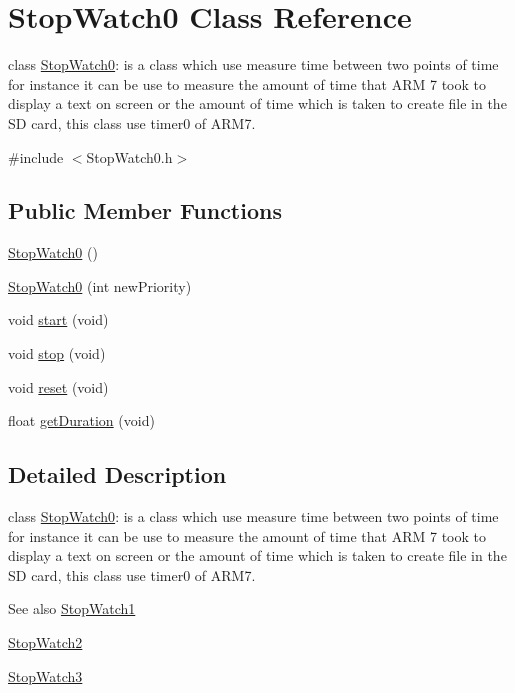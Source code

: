 \hypertarget{class_stop_watch0}{
\section{StopWatch0 Class Reference}
\label{class_stop_watch0}
}


class \hyperlink{class_stop_watch0}{StopWatch0}: is a class which use measure time between two points of time for instance it can be use to measure the amount of time that ARM 7 took to display a text on screen or the amount of time which is taken to create file in the SD card, this class use timer0 of ARM7.  




{\ttfamily \#include $<$StopWatch0.h$>$}

\subsection*{Public Member Functions}
\begin{DoxyCompactItemize}
\item 
\hyperlink{class_stop_watch0_a400c08cdf400f11f37320533a76c8bba}{StopWatch0} ()
\item 
\hyperlink{class_stop_watch0_a15913e022f1981ad4b84f0e417461edc}{StopWatch0} (int newPriority)
\item 
void \hyperlink{class_stop_watch0_ad7ae4c58ef2769776c5b5dd3f6b6c244}{start} (void)
\item 
void \hyperlink{class_stop_watch0_a0162158cbd2d6a755ef80998612ffe0f}{stop} (void)
\item 
void \hyperlink{class_stop_watch0_aff26b9ae9e3fa43088e577c414b4245e}{reset} (void)
\item 
float \hyperlink{class_stop_watch0_ae0474dfaf94bb5bb1f2389e18ca7cd34}{getDuration} (void)
\end{DoxyCompactItemize}


\subsection{Detailed Description}
class \hyperlink{class_stop_watch0}{StopWatch0}: is a class which use measure time between two points of time for instance it can be use to measure the amount of time that ARM 7 took to display a text on screen or the amount of time which is taken to create file in the SD card, this class use timer0 of ARM7. 

\begin{DoxySeeAlso}{See also}
\hyperlink{class_stop_watch1}{StopWatch1} 

\hyperlink{class_stop_watch2}{StopWatch2} 

\hyperlink{class_stop_watch3}{StopWatch3} 
\end{DoxySeeAlso}


